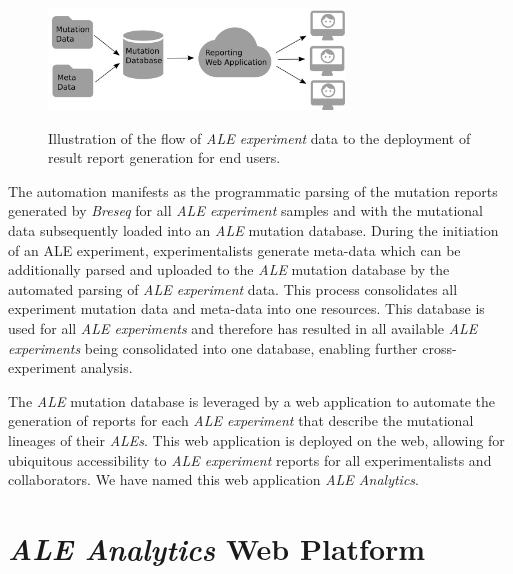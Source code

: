 \documentclass[12pt,final,masters,chapterheads]{ucsd}  %
\begin{document}
\begin{figure}[H]
  \caption{Illustration of the flow of \textit{ALE experiment} data to the deployment of result report generation for end users.}
  \centering
  \includegraphics[width=0.7\textwidth]{deployment_diagram.png}
  \label{fig:deployment}
\end{figure}

The automation manifests as the programmatic parsing of the mutation reports generated by \textit{Breseq} for all \textit{ALE experiment} samples and with the mutational data subsequently loaded into an \textit{ALE} mutation database. During the initiation of an ALE experiment, experimentalists generate meta-data which can be additionally parsed and uploaded to the \textit{ALE} mutation database by the automated parsing of \textit{ALE experiment} data. This process consolidates all experiment mutation data and meta-data into one resources. This database is used for all \textit{ALE experiments} and therefore has resulted in all available \textit{ALE experiments} being consolidated into one database, enabling further cross-experiment analysis.

The \textit{ALE} mutation database is leveraged by a web application to automate the generation of reports for each \textit{ALE experiment} that describe the mutational lineages of their \textit{ALEs}. This web application is deployed on the web, allowing for ubiquitous accessibility to \textit{ALE experiment} reports for all experimentalists and collaborators. We have named this web application \textit{ALE Analytics}.

\section{\textit{ALE Analytics} Web Platform}

%
%
\end{document}
